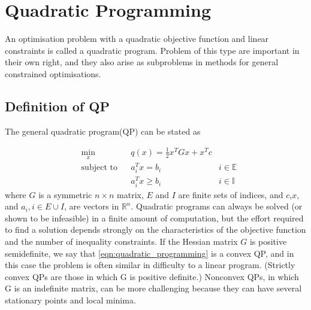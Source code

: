 
\chapter{Quadratic Programming} %

\label{ChapterX} %

An optimisation problem with a quadratic objective function and linear constraints is called a quadratic program. Problem of this type are important in their own right, and they also arise as subproblems in methods for general constrained optimisations. 

\section{Definition of QP}

The general quadratic program(QP) can be stated as

\begin{equation}
\begin{aligned}
& \underset{x}{\text{min}}
& & q(x)= \frac{1}{2}x^{T}Gx+x^{T}c \\
& \text{subject to} & &  a_{i}^{T}x = b_i & i\in \mathbb{E} \\
& & &  a_i^{T}x \geqslant b_{i} & i\in \mathbb{I}
\end{aligned}
\label{eqn:quadratic_programming}
\end{equation}
where $G$ is a symmetric $n\times n$ matrix, $E$ and $I$ are finite sets of indices, and $c$,$x$, and $a_i, i\in E \cup I$, are vectors in $\mathbb{R}^n$. Quadratic programs can always be solved (or shown to be infeasible) in a finite amount of computation, but the effort required to find a solution depends strongly on the characteristics of the objective function and the number of inequality constraints. If the Hessian matrix $G$ is positive semidefinite, we say that \ref{eqn:quadratic_programming} is a convex QP, and in this case the problem is often similar in difficulty to a linear program. (Strictly convex QPs are those in which G is positive definite.) Nonconvex QPs, in which G is an indefinite matrix, can be more challenging because they can have several stationary points and local minima.


